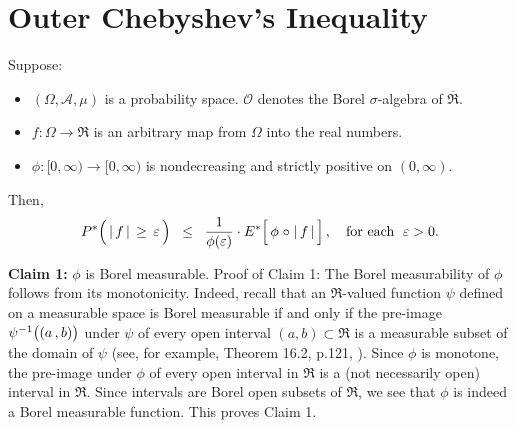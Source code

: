 

\section{Outer Chebyshev's Inequality}
\setcounter{theorem}{0}
\setcounter{equation}{0}


\renewcommand{\theenumi}{\roman{enumi}}
\renewcommand{\labelenumi}{\textnormal{(\theenumi)}$\;\;$}


\begin{theorem}
\mbox{}\vskip 0.1cm
\noindent
Suppose:
\begin{itemize}
\item
	$(\Omega,\mathcal{A},\mu)$ is a probability space.
	$\mathcal{O}$ denotes the Borel $\sigma$-algebra of $\overline{\Re}$.
\item
	$f : \Omega \longrightarrow \Re$ is an arbitrary map from $\Omega$ into the real numbers.
\item
	$\phi : [0,\infty) \longrightarrow [0,\infty)$ is nondecreasing and strictly positive on $(0,\infty)$.
\end{itemize}
Then,
\begin{equation*}
P^{*}\!\left(\,\vert\,\overset{{\color{white}.}}{f}\,\vert\,\geq\,\varepsilon\,\right)
\;\;\leq\;\;
	\dfrac{1}{\phi(\varepsilon)} \cdot E^{*}\!\left[\,\phi\overset{{\color{white}-}}{\circ}\vert\,f\,\vert\,\right],
	\quad
	\textnormal{for each \;$\varepsilon > 0$}.
\end{equation*}
\end{theorem}
\proof

\vskip 0.5cm
\noindent
\textbf{Claim 1:}\;\; $\phi$ is Borel measurable.
\vskip 0.1cm
\noindent
Proof of Claim 1: The Borel measurability of $\phi$ follows from its monotonicity.
Indeed, recall that an $\Re$-valued function $\psi$ defined on a measurable space is Borel measurable
if and only if
the pre-image $\psi^{-1}\!\left((a\overset{{\color{white}-}}{,}b)\right)$ under $\psi$ of every open interval
$(a,b)\subset\Re$ is a measurable subset of the domain of $\psi$
(see, for example, Theorem 16.2, p.121, \cite{Aliprantis1998}).
Since $\phi$ is monotone, the pre-image under $\phi$ of every open interval in $\Re$ is a
(not necessarily open) interval in $\Re$.
Since intervals are Borel open subsets of $\Re$, we see that $\phi$ is indeed a Borel measurable function.
This proves Claim 1.

